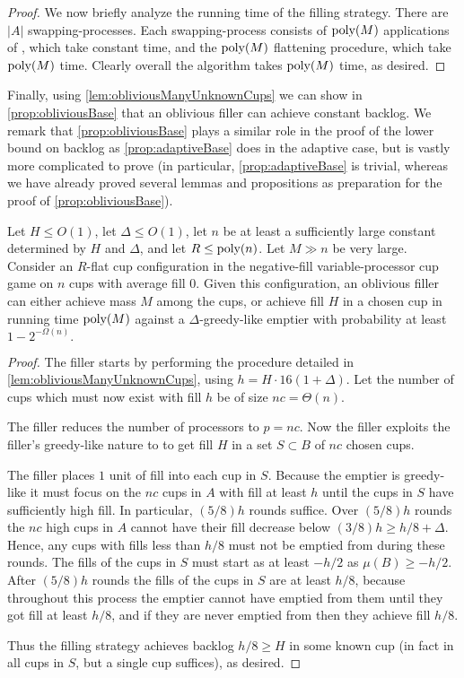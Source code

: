 \begin{proof}
We now briefly analyze the running time of the filling strategy.
There are $|A|$ swapping-processes. Each swapping-process
consists of $\operatorname{\text{poly}}(M)$ applications of \randalg, which take
constant time, and the $\operatorname{\text{poly}}(M)$ flattening procedure, which
take $\operatorname{\text{poly}}(M)$ time. Clearly overall the algorithm takes
$\operatorname{\text{poly}}(M)$ time, as desired.
  
\end{proof}

Finally, using \cref{lem:obliviousManyUnknownCups} we can show in
\cref{prop:obliviousBase} that an oblivious filler can achieve
constant backlog. We remark that \cref{prop:obliviousBase} plays a
similar role in the proof of the lower bound on backlog as
\cref{prop:adaptiveBase} does in the adaptive case, but is vastly
more complicated to prove (in particular,
\cref{prop:adaptiveBase} is trivial, whereas we have already
proved several lemmas and propositions as preparation for the
proof of \cref{prop:obliviousBase}).
\begin{proposition}
  \label{prop:obliviousBase}
  Let $H \le O(1)$, let $\Delta \le O(1)$, let $n$ be at
  least a sufficiently large constant determined by $H$ and
  $\Delta$, and let $R \le \operatorname{\text{poly}}(n)$. 
  Let $M \gg n$ be very large.
  Consider an $R$-flat cup configuration in the negative-fill variable-processor cup
  game on $n$ cups with average fill $0$.
  Given this configuration, an oblivious filler can either
  achieve mass $M$ among the cups, or achieve fill $H$
  in a chosen cup in running time $\operatorname{\text{poly}}(M)$ against a
  $\Delta$-greedy-like emptier with probability at least $1-2^{-\Omega(n)}.$
\end{proposition}
\begin{proof}
  The filler starts by performing the procedure detailed in
  \cref{lem:obliviousManyUnknownCups}, using $h = H\cdot
  16(1+\Delta)$. Let the number of cups which must now exist with
  fill $h$ be of size $nc = \Theta(n)$.

  The filler reduces the number of processors to $p=nc$. 
  Now the filler exploits the filler's greedy-like nature to
  to get fill $H$ in a set $S\subset B$ of $nc$ chosen cups.

  The filler places $1$ unit of fill into each cup in $S$.
  Because the emptier is greedy-like it must focus on the $nc$
  cups in $A$ with fill at least $h$ until the cups in $S$ have
  sufficiently high fill. In particular, $(5/8)h$ rounds suffice.
  Over $(5/8)h$ rounds the $nc$ high cups in $A$ cannot have
  their fill decrease below $(3/8)h \ge h/8 + \Delta$. Hence, any
  cups with fills less than $h/8$ must not be emptied from during
  these rounds. The fills of the cups in $S$ must start as at
  least $-h/2$ as $\mu(B) \ge -h/2$. After $(5/8)h$ rounds the
  fills of the cups in $S$ are at least $h/8$, because throughout
  this process the emptier cannot have emptied from them until
  they got fill at least $h/8$, and if they are never emptied
  from then they achieve fill $h/8$.

  Thus the filling strategy achieves backlog $h/8 \ge H$ in some
  known cup (in fact in all cups in $S$, but a single cup
  suffices), as desired.

\end{proof}

